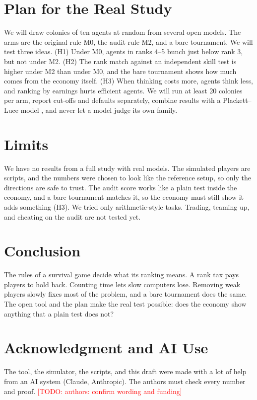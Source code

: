 \documentclass[conference]{IEEEtran}
\theoremstyle{plain}
\newcommand{\todo}[1]{\textcolor{red}{[TODO: #1]}}
\begin{document}
\section{Plan for the Real Study}
We will draw colonies of ten agents at random from several open models. The arms are the original rule M0, the audit rule M2, and a bare tournament. We will test three ideas. (H1) Under M0, agents in ranks 4--5 bunch just below rank 3, but not under M2. (H2) The rank match against an independent skill test is higher under M2 than under M0, and the bare tournament shows how much comes from the economy itself. (H3) When thinking costs more, agents think less, and ranking by earnings hurts efficient agents. We will run at least 20 colonies per arm, report cut-offs and defaults separately, combine results with a Plackett--Luce model \cite{murphy2026agentisland}, and never let a model judge its own family.

\section{Limits}
We have no results from a full study with real models. The simulated players are scripts, and the numbers were chosen to look like the reference setup, so only the directions are safe to trust. The audit score works like a plain test inside the economy, and a bare tournament matches it, so the economy must still show it adds something (H3). We tried only arithmetic-style tasks. Trading, teaming up, and cheating on the audit are not tested yet.

\section{Conclusion}
The rules of a survival game decide what its ranking means. A rank tax pays players to hold back. Counting time lets slow computers lose. Removing weak players slowly fixes most of the problem, and a bare tournament does the same. The open tool and the plan make the real test possible: does the economy show anything that a plain test does not?

\section*{Acknowledgment and AI Use}
The tool, the simulator, the scripts, and this draft were made with a lot of help from an AI system (Claude, Anthropic). The authors must check every number and proof. \todo{authors: confirm wording and funding}



\end{document}
